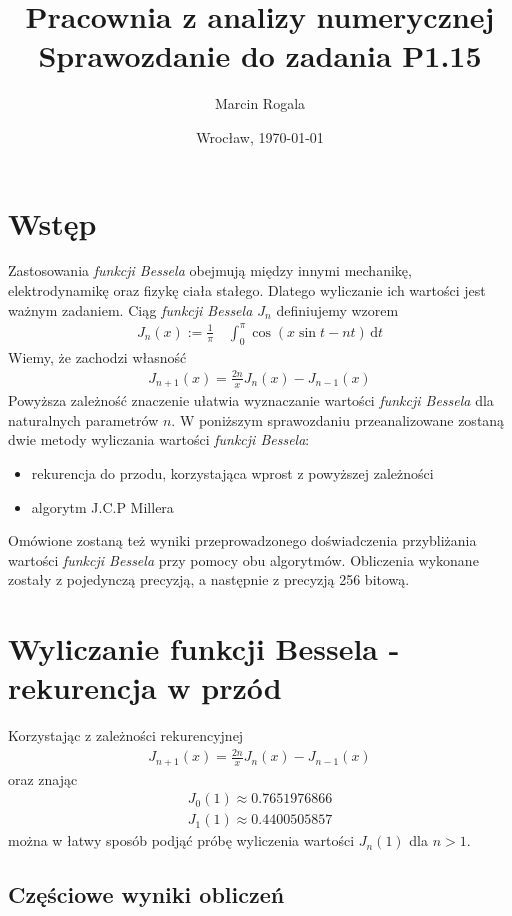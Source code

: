 \documentclass{article}
\title{\LARGE\textbf{Pracownia z analizy numerycznej}\\ Sprawozdanie do zadania \Large\textbf{P1.15}}
\author{Marcin Rogala}
\date{Wrocław, \today}
\begin{document}
\maketitle
\thispagestyle{empty} 

\section{Wstęp}
Zastosowania \textit{funkcji Bessela} obejmują między innymi mechanikę, elektrodynamikę oraz fizykę ciała stałego. Dlatego wyliczanie ich wartości jest ważnym zadaniem.
Ciąg \textit{funkcji Bessela $J_n$} definiujemy wzorem
\begin{align}
J_n(x) := \frac{1}{\pi}\! \quad\int_{0}^{\pi} \cos(x\sin t - nt)\,\mathrm{d}t \tag*{(n = 0, 1,..).}
\end{align} 
Wiemy, że zachodzi własność
\begin{align} 
J_{n+ 1}(x) = \frac{2n}{x}J_n(x) - J_{n - 1}(x) \tag*{(n = 1, 2,..).}
\end{align}
Powyższa zależność znaczenie ułatwia wyznaczanie wartości \textit{funkcji Bessela} dla naturalnych parametrów $n$. W poniższym sprawozdaniu przeanalizowane zostaną dwie metody wyliczania wartości \textit{funkcji Bessela}:
\begin{itemize}
\item rekurencja do przodu, korzystająca wprost z powyższej zależności
\item algorytm J.C.P Millera
\end{itemize}
Omówione zostaną też wyniki przeprowadzonego doświadczenia przybliżania wartości \textit{funkcji Bessela} przy pomocy obu algorytmów. Obliczenia wykonane zostały z pojedynczą precyzją, a następnie z precyzją 256 bitową. 

\section{Wyliczanie funkcji Bessela - rekurencja w przód}
Korzystając z zależności rekurencyjnej
\begin{align} 
J_{n+ 1}(x) = \frac{2n}{x}J_n(x) - J_{n - 1}(x) \tag*{(n = 1, 2,..).}
\end{align}
oraz znając
\begin{align*} 
J_0(1) \approx 0.7651976866\\
J_1(1) \approx 0.4400505857
\end{align*}
można w łatwy sposób podjąć próbę wyliczenia wartości $J_n(1)$ dla $n > 1$.

\subsection{Częściowe wyniki obliczeń}
\end{document}
